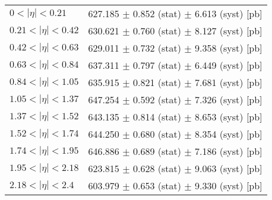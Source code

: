 \begin{tabular}{lc}
\hline
$0 < |\eta| <0.21$             & 627.185 $\pm$ 0.852 (stat) $\pm$ 6.613 (syst) [pb]  \\
$0.21 < |\eta| <0.42$          & 630.621 $\pm$ 0.760 (stat) $\pm$ 8.127 (syst) [pb]  \\
$0.42 < |\eta| <0.63$          & 629.011 $\pm$ 0.732 (stat) $\pm$ 9.358 (syst) [pb]  \\
$0.63 < |\eta| <0.84$          & 637.311 $\pm$ 0.797 (stat) $\pm$ 6.449 (syst) [pb]  \\
$0.84 < |\eta| <1.05$          & 635.915 $\pm$ 0.821 (stat) $\pm$ 7.681 (syst) [pb]  \\
$1.05 < |\eta| <1.37$          & 647.254 $\pm$ 0.592 (stat) $\pm$ 7.326 (syst) [pb]  \\
$1.37 < |\eta| <1.52$          & 643.135 $\pm$ 0.814 (stat) $\pm$ 8.653 (syst) [pb]  \\
$1.52 < |\eta| <1.74$          & 644.250 $\pm$ 0.680 (stat) $\pm$ 8.354 (syst) [pb]  \\
$1.74 < |\eta| <1.95$          & 646.886 $\pm$ 0.689 (stat) $\pm$ 7.186 (syst) [pb]  \\
$1.95 < |\eta| <2.18$          & 623.815 $\pm$ 0.628 (stat) $\pm$ 9.063 (syst) [pb]  \\
$2.18 < |\eta| <2.4$           & 603.979 $\pm$ 0.653 (stat) $\pm$ 9.330 (syst) [pb]  \\
\hline
\end{tabular}
